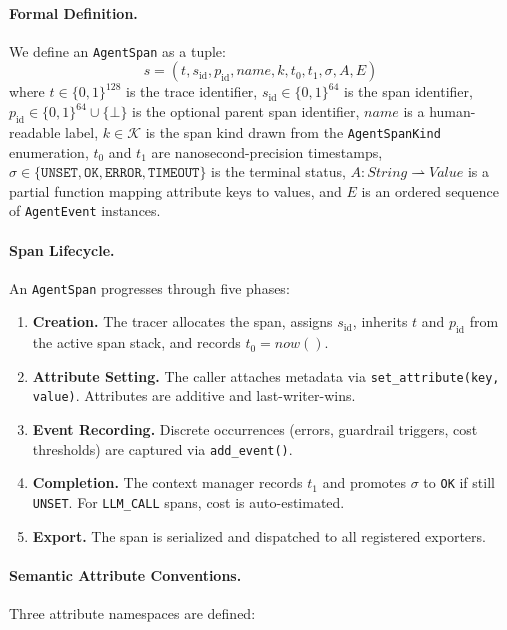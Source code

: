 \documentclass[sigplan,10pt,screen]{acmart}
\begin{document}
\paragraph{Formal Definition.}
We define an \texttt{AgentSpan} as a tuple:
\[
  s = (t, s_{\mathrm{id}}, p_{\mathrm{id}}, \mathit{name}, k, t_0, t_1, \sigma, A, E)
\]
where $t \in \{0,1\}^{128}$ is the trace identifier, $s_{\mathrm{id}} \in \{0,1\}^{64}$ is the span identifier, $p_{\mathrm{id}} \in \{0,1\}^{64} \cup \{\bot\}$ is the optional parent span identifier, $\mathit{name}$ is a human-readable label, $k \in \mathcal{K}$ is the span kind drawn from the \texttt{AgentSpanKind} enumeration, $t_0$ and $t_1$ are nanosecond-precision timestamps, $\sigma \in \{\texttt{UNSET}, \texttt{OK}, \texttt{ERROR}, \texttt{TIMEOUT}\}$ is the terminal status, $A : \mathit{String} \rightharpoonup \mathit{Value}$ is a partial function mapping attribute keys to values, and $E$ is an ordered sequence of \texttt{AgentEvent} instances.

\paragraph{Span Lifecycle.}
An \texttt{AgentSpan} progresses through five phases:
\begin{enumerate}[leftmargin=*,nosep]
    \item \textbf{Creation.}  The tracer allocates the span, assigns $s_{\mathrm{id}}$, inherits $t$ and $p_{\mathrm{id}}$ from the active span stack, and records $t_0 = \mathit{now}()$.
    \item \textbf{Attribute Setting.}  The caller attaches metadata via \texttt{set\_attribute(key, value)}.  Attributes are additive and last-writer-wins.
    \item \textbf{Event Recording.}  Discrete occurrences (errors, guardrail triggers, cost thresholds) are captured via \texttt{add\_event()}.
    \item \textbf{Completion.}  The context manager records $t_1$ and promotes $\sigma$ to \texttt{OK} if still \texttt{UNSET}.  For \texttt{LLM\_CALL} spans, cost is auto-estimated.
    \item \textbf{Export.}  The span is serialized and dispatched to all registered exporters.
\end{enumerate}

\paragraph{Semantic Attribute Conventions.}
Three attribute namespaces are defined:
\end{document}
